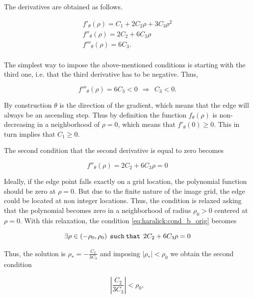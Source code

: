 \documentclass{ipol}
\numberwithin{equation}{section}
\numberwithin{table}{section}
\begin{document}
The derivatives are obtained as follows.

\begin{align}
	f'_{\theta}(\rho) = C_1 + 2C_2\rho + 3C_3\rho^2 \nonumber \\
	f''_{\theta}(\rho) = 2C_2 + 6C_3\rho \nonumber \\
	f'''_{\theta}(\rho) = 6C_3 .\nonumber \\
\end{align}

The simplest way to impose the above-mentioned conditions is starting with the third one, i.e. that the third derivative has to be negative. Thus,

\begin{equation}
	f'''_{\theta}(\rho) = 6C_3 < 0 \ \ \Rightarrow \ \ C_3 < 0.
\end{equation}

By construction $\theta$ is the direction of the gradient, which means that the edge will always be an ascending step. Thus by definition the function $f_{\theta}(\rho)$ is non-decreasing in a neighborhood of $\rho=0$, which means that $f'_{\theta}(0) \geq 0$. This in turn implies that $C_1 \geq 0$.

The second condition that the second derivative is equal to zero becomes

\begin{equation}\label{eq:haralick:cond_b_orig}
	f''_{\theta}(\rho) = 2C_2 + 6C_3\rho = 0
\end{equation}

Ideally, if the edge point falls exactly on a grid location, the polynomial function 
should be zero at $\rho=0$. But due to the finite nature of the image grid, the edge could be located at non integer locations. Thus, the condition is relaxed asking that the polynomial becomes zero in a neighborhood of radius $\rho_0>0$ centered at $\rho=0$. 
With this relaxation, the condition \ref{eq:haralick:cond_b_orig} becomes

\begin{equation}
\exists\rho \in (-\rho_0,\rho_0) \:\:  \mathtt{such\:that}  \:\:  2C_2 + 6C_3\rho = 0 \\
\end{equation}

Thus, the solution is $\rho_*=-\frac{C_2}{3C_3} $ and imposing $|\rho_*|<\rho_0$ we obtain the second condition

\begin{equation}
\left| \frac{C_2}{3C_3} \right| < \rho_0,
\end{equation}
\end{document}

